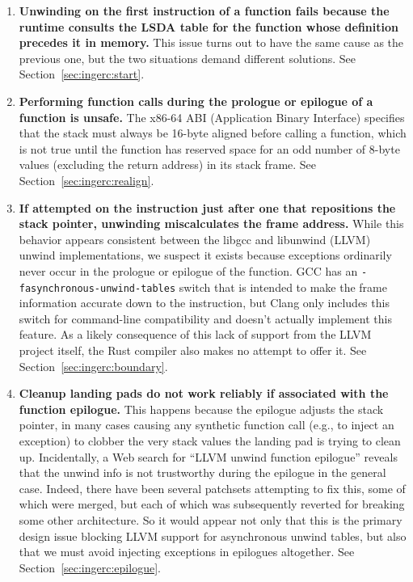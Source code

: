 \begin{enumerate}
\item \textbf{Unwinding on the first instruction of a function fails because the
runtime consults the LSDA table for the function whose definition precedes it in
memory.}  This issue turns out to have the same cause as the previous one, but the
two situations demand different solutions.  See Section~\ref{sec:ingerc:start}.

\item \textbf{Performing function calls during the prologue or epilogue of a function
is unsafe.}  The x86-64 ABI (Application Binary Interface) specifies that the stack
must always be 16-byte aligned before calling a function, which is not true until the
function has reserved space for an odd number of 8-byte values (excluding the return
address) in its stack frame.  See Section~\ref{sec:ingerc:realign}.

\item \textbf{If attempted on the instruction just after one that repositions the
stack pointer, unwinding miscalculates the frame address.}  While this behavior
appears consistent between the libgcc and libunwind (LLVM) unwind implementations, we
suspect it exists because exceptions ordinarily never occur in the prologue or
epilogue of the function.  GCC has an \texttt{-fasynchronous-unwind-tables} switch
that is intended to make the frame information accurate down to the instruction, but
Clang only includes this switch for command-line compatibility and doesn't actually
implement this feature.  As a likely consequence of this lack of support from the
LLVM project itself, the Rust compiler also makes no attempt to offer it.  See
Section~\ref{sec:ingerc:boundary}.

\item \textbf{Cleanup landing pads do not work reliably if associated with the
function epilogue.}  This happens because the epilogue adjusts the stack pointer,
in many cases causing any synthetic function call (e.g., to inject an exception) to
clobber the very stack values the landing pad is trying to clean up.  Incidentally,
a Web search for ``LLVM unwind function epilogue'' reveals that the unwind info is
not trustworthy during the epilogue in the general case.  Indeed, there have been
several patchsets attempting to fix this, some of which were merged, but each of
which was subsequently reverted for breaking some other architecture.  So it would
appear not only that this is the primary design issue blocking LLVM support for
asynchronous unwind tables, but also that we must avoid injecting exceptions in
epilogues altogether.  See Section~\ref{sec:ingerc:epilogue}.

\end{enumerate}

